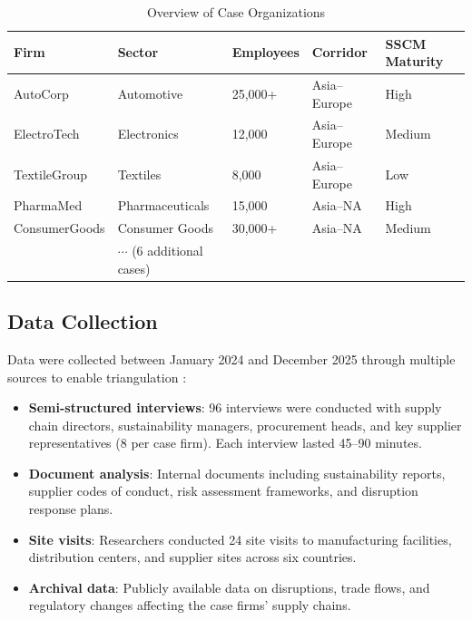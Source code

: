 \documentclass[12pt,a4paper,twoside]{article}
\begin{document}
\begin{table}[htbp]
\centering
\caption{Overview of Case Organizations}
\label{tab:cases}
\begin{tabular}{@{}p{2.5cm}p{2.5cm}p{2.5cm}p{2cm}p{3cm}@{}}
\toprule
\textbf{Firm} & \textbf{Sector} & \textbf{Employees} & \textbf{Corridor} & \textbf{SSCM Maturity} \\
\midrule
AutoCorp & Automotive & 25,000+ & Asia--Europe & High \\
ElectroTech & Electronics & 12,000 & Asia--Europe & Medium \\
TextileGroup & Textiles & 8,000 & Asia--Europe & Low \\
PharmaMed & Pharmaceuticals & 15,000 & Asia--NA & High \\
ConsumerGoods & Consumer Goods & 30,000+ & Asia--NA & Medium \\
& $\cdots$ (6 additional cases) \\
\bottomrule
\end{tabular}
\end{table}

\subsection{Data Collection}

Data were collected between January 2024 and December 2025 through multiple
sources to enable triangulation \citep{jackson1986approaches}:

\begin{itemize}
  \item \textbf{Semi-structured interviews}: 96 interviews were conducted with
        supply chain directors, sustainability managers, procurement heads, and
        key supplier representatives (8 per case firm).  Each interview lasted
        45--90 minutes.
  \item \textbf{Document analysis}: Internal documents including sustainability
        reports, supplier codes of conduct, risk assessment frameworks, and
        disruption response plans.
  \item \textbf{Site visits}: Researchers conducted 24 site visits to
        manufacturing facilities, distribution centers, and supplier sites
        across six countries.
  \item \textbf{Archival data}: Publicly available data on disruptions, trade
        flows, and regulatory changes affecting the case firms' supply chains.
\end{itemize}
\end{document}
